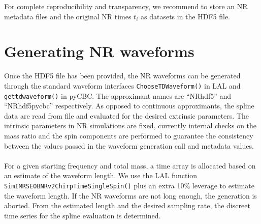 \documentclass[a4paper, 11pt]{article}
\begin{document}
For complete reproducibility and transparency, we recommend to store an NR metadata files and the original NR times $t_i$ as datasets in the HDF5 file.

\section{Generating NR waveforms}
\label{sec:gen}
Once the HDF5 file has been provided, the NR waveforms can be generated through the standard waveform interfaces \texttt{ChooseTDWaveform()} in LAL
and \texttt{get\textunderscore td\textunderscore waveform()} in pyCBC. The approximant names are ``NR\textunderscore hdf5'' and ``NR\textunderscore hdf5\textunderscore pycbc'' respectively. 
As opposed to continuous approximants, the spline data are read from file and evaluated for the desired extrinsic
parameters. The intrinsic parameters in NR simulations are fixed, currently internal checks on the mass ratio and the spin components 
are performed to guarantee the consistency between the values passed
in the waveform generation call and metadata values. \\
\\For a given starting frequency and total mass, a time array is allocated based on an estimate of the waveform length. We use the LAL function 
\texttt{SimIMRSEOBNRv2ChirpTimeSingleSpin()} plus an extra 10\% leverage to estimate the waveform length. If the NR waveforms are not long
enough, the generation is aborted. From the estimated length and the desired sampling rate, the discreet time series for the spline evaluation is
determined.
\end{document}

